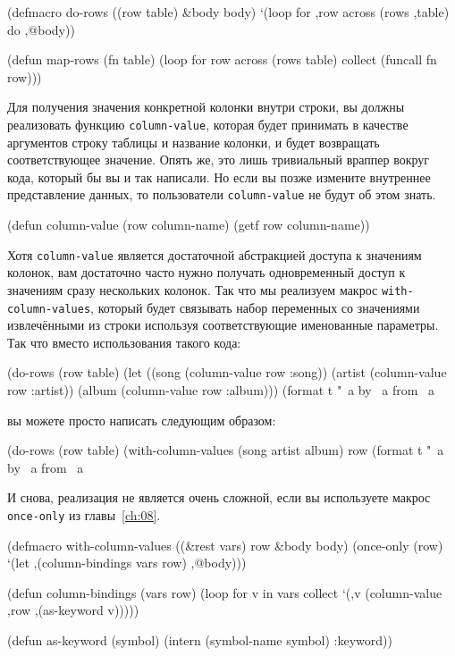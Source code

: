 \begin{myverb}
(defmacro do-rows ((row table) &body body)
  `(loop for ,row across (rows ,table) do ,@body))

(defun map-rows (fn table)
  (loop for row across (rows table) collect (funcall fn row)))
\end{myverb}

Для получения значения конкретной колонки внутри строки, вы должны реализовать функцию
\lstinline{column-value}, которая будет принимать в качестве аргументов строку таблицы и
название колонки, и будет возвращать соответствующее значение.  Опять же, это лишь
тривиальный враппер вокруг кода, который бы вы и так написали.  Но если вы позже измените
внутреннее представление данных, то пользователи \lstinline{column-value} не будут об этом
знать.

\begin{myverb}
(defun column-value (row column-name)
  (getf row column-name))
\end{myverb}

Хотя \lstinline{column-value} является достаточной абстракцией доступа к значениям колонок, вам
достаточно часто нужно получать одновременный доступ к значениям сразу нескольких колонок.
Так что мы реализуем макрос \lstinline{with-column-values}, который будет связывать набор
переменных со значениями извлечёнными из строки используя соответствующие именованные
параметры.  Так что вместо использования такого кода:

\begin{myverb}
 (do-rows (row table)
   (let ((song (column-value row :song))
         (artist (column-value row :artist))
         (album (column-value row :album)))
     (format t "~a by ~a from ~a~%
\end{myverb}

вы можете просто написать следующим образом:

\begin{myverb}
(do-rows (row table)
  (with-column-values (song artist album) row
    (format t "~a by ~a from ~a~%
\end{myverb}

И снова, реализация не является очень сложной, если вы используете макрос \lstinline{once-only}
из главы~\ref{ch:08}.

\begin{myverb}
(defmacro with-column-values ((&rest vars) row &body body)
  (once-only (row)
    `(let ,(column-bindings vars row) ,@body)))

(defun column-bindings (vars row)
  (loop for v in vars collect `(,v (column-value ,row ,(as-keyword v)))))

(defun as-keyword (symbol)
  (intern (symbol-name symbol) :keyword))
\end{myverb}

